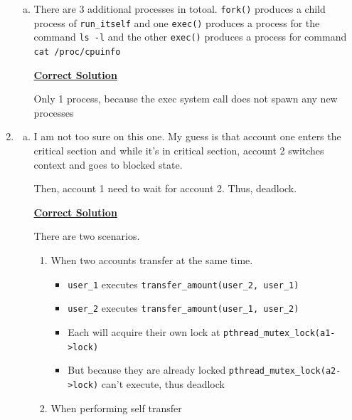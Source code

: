 \documentclass[12pt]{article}
\begin{document}
\begin{enumerate}[1.]
\begin{enumerate}[a)]
        \item

        There are 3 additional processes in totoal. \texttt{fork()} produces a child
        process of \texttt{run\_itself} and one \texttt{exec()} produces a process for the
        command \texttt{ls -l} and the other \texttt{exec()} produces a process for
        command \texttt{cat /proc/cpuinfo}

        \bigskip

        \begin{mdframed}
        \underline{\textbf{Correct Solution}}

        \bigskip

        \color{red}Only 1 process, because the exec system call does not spawn any new processes\color{black}
        \end{mdframed}

    \end{enumerate}

    \item

    \begin{enumerate}[a)]

        \item

        I am not too sure on this one. My guess is that account one enters the critical section
        and while it's in critical section, account 2 switches context and goes to blocked state.

        \bigskip

        Then, account 1 need to wait for account 2. Thus, deadlock.
        \bigskip

        \begin{mdframed}
        \underline{\textbf{Correct Solution}}

        \bigskip

        \color{red}
        There are two scenarios.

        \begin{enumerate}[1.]
            \item When two accounts transfer at the same time.
            \begin{itemize}
                \item \texttt{user\_1} executes \texttt{transfer\_amount(user\_2, user\_1)}
                \item \texttt{user\_2} executes \texttt{transfer\_amount(user\_1, user\_2)}
                \item Each will acquire their own lock at \texttt{pthread\_mutex\_lock(a1->lock)}
                \item But because they are already locked \texttt{pthread\_mutex\_lock(a2->lock)} can't execute,
                thus deadlock
            \end{itemize}
            \item When performing self transfer


\end{enumerate}
\end{mdframed}
\end{enumerate}
\end{enumerate}
\end{document}
